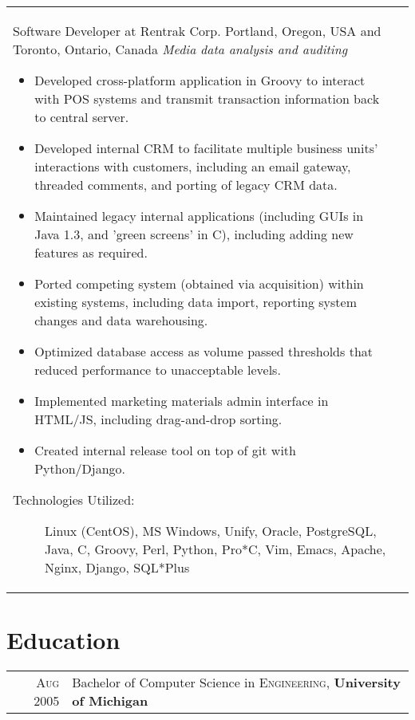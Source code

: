 {{{{{{{{{{{\begin{tabular}{ R{1.5cm} | p{10.5cm} }
            Software Developer at Rentrak Corp.\newline
            Portland, Oregon, USA and Toronto, Ontario, Canada\newline
            \emph{Media data analysis and auditing} \newline
            \fontsize{9pt}{10pt}\selectfont
            \begin{itemize}
                \item Developed cross-platform application in Groovy to interact with POS
                    systems and transmit transaction information back to central server.
                \item Developed internal CRM to facilitate multiple business units' interactions
                    with customers, including an email gateway, threaded comments, and porting of
                    legacy CRM data.
                \item Maintained legacy internal applications (including GUIs in Java 1.3, and
                    'green screens' in C), including adding new features as required.
                \item Ported competing system (obtained via acquisition) within existing systems,
                    including data import, reporting system changes and data warehousing.
                \item Optimized database access as volume passed thresholds that reduced
                    performance to unacceptable levels.
                \item Implemented marketing materials admin interface in HTML/JS, including
                    drag-and-drop sorting.
                \item Created internal release tool on top of git with Python/Django.
            \end{itemize}
            \bigskip
            \begin{description}
                \item[Technologies Utilized:]
                    Linux (CentOS), MS Windows, Unify, Oracle, PostgreSQL,
                    Java, C, Groovy, Perl, Python, Pro*C, Vim, Emacs, Apache,
                    Nginx, Django, SQL*Plus
            \end{description}
            \\
        \end{tabular}
    {%

    {%
        \section{Education}
        \begin{tabular}{rl}
        \textsc{Aug} 2005 & Bachelor of Computer Science in \textsc{Engineering}, \textbf{University of Michigan}\\
        \end{tabular}
    {%

}}}}}}}}}}}}}}
